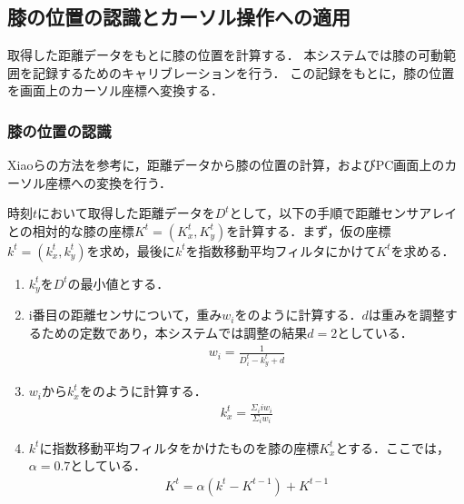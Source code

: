 \documentclass[submit, techrep]{ipsj}
\begin{document}

\subsection{膝の位置の認識とカーソル操作への適用}
取得した距離データをもとに膝の位置を計算する．
本システムでは膝の可動範囲を記録するためのキャリブレーションを行う．
この記録をもとに，膝の位置を画面上のカーソル座標へ変換する．
\subsubsection{膝の位置の認識}
Xiao\cite{Xiao:2018:LOP:3173574.3173669}らの方法を参考に，距離データから膝の位置の計算，およびPC画面上のカーソル座標への変換を行う．

時刻$t$において取得した距離データを$D^t$として，以下の手順で距離センサアレイとの相対的な膝の座標$K^t=(K^t_x, K^t_y)$を計算する．まず，仮の座標$k^t=(k^t_x, k^t_y)$を求め，最後に$k^t$を指数移動平均フィルタにかけて$K^t$を求める．
\begin{enumerate}
	\item $k^t_y$を$D^t$の最小値とする．
	\item i番目の距離センサについて，重み$w_i$をのように計算する．$d$は重みを調整するための定数であり，本システムでは調整の結果$d=2$としている．
	\begin{eqnarray}
		\label{eq:weight}
		w_i = \frac{1}{D^t_i - k^t_y + d}
	\end{eqnarray}
	\item $w_i$から$k^t_x$をのように計算する．
	\begin{eqnarray}
		\label{eq:calc_x}
			k^t_x = \frac{\Sigma_i iw_i}{\Sigma_i w_i}
	\end{eqnarray}
	\item $k^t$に指数移動平均フィルタをかけたものを膝の座標$K^t_x$とする．ここでは，$\alpha=0.7$としている．
\begin{eqnarray}
	\label{eq:filter}
	K^t = \alpha (k^t - K^{t-1}) + K^{t-1}
	\end{eqnarray}
\end{enumerate}
\end{document}
